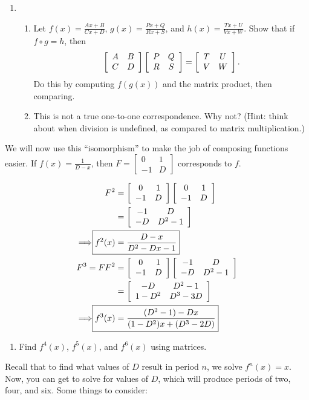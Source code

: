 \documentclass[../gatm.tex]{subfiles}
\begin{document}
\begin{enumerate}
\setcounter{enumi}{\value{problem_i}}
\item \begin{enumerate}
\item Let $f(x)=\frac{Ax+B}{Cx+D}$, $g(x)=\frac{Px+Q}{Rx+S}$, and $h(x)=\frac{Tx+U}{Vx+W}$. Show that if $f\circ g = h$, then
$$\left[\begin{array}{cc} A & B \\ C & D \end{array}\right]\left[\begin{array}{cc} P & Q \\ R & S \end{array}\right]=\left[\begin{array}{cc} T & U \\ V & W \end{array}\right].$$
Do this by computing $f(g(x))$ and the matrix product, then comparing.
\item This is not a true one-to-one correspondence. Why not? (Hint: think about when division is undefined, as compared to matrix multiplication.)
\end{enumerate}
\setcounter{problem_i}{\value{enumi}}
\end{enumerate}

\noindent We will now use this ``isomorphism'' to make the job of composing functions easier. If $f(x)=\frac{1}{D-x}$, then $F=\left[\begin{array}{cc} 0 & 1 \\ -1 & D \end{array}\right]$ corresponds to $f$.

\begin{align*}
F^2 &= \twomat{0}{1}{-1}{D}\twomat{0}{1}{-1}{D} \\
&= \twomat{-1}{D}{-D}{D^2-1} \\
\Longrightarrow \Aboxed{f^2(x) &= \frac{D-x}{D^2-Dx-1}} \\
F^3 = FF^2 &= \twomat{0}{1}{-1}{D}\twomat{-1}{D}{-D}{D^2-1} \\
&= \twomat{-D}{D^2-1}{1-D^2}{D^3-3D} \\
\Longrightarrow \Aboxed{f^3(x) &= \frac{(D^2-1)-Dx}{(1-D^2)x+(D^3-2D)}}
\end{align*}

\begin{enumerate}
\setcounter{enumi}{\value{problem_i}}
\item Find $f^4(x)$, $f^5(x)$, and $f^6(x)$ using matrices.
\setcounter{problem_i}{\value{enumi}}
\end{enumerate}

\noindent Recall that to find what values of $D$ result in period $n$, we solve $f^n(x)=x$. Now, you can get to solve for values of $D$, which will produce periods of two, four, and six. Some things to consider:
\end{document}

